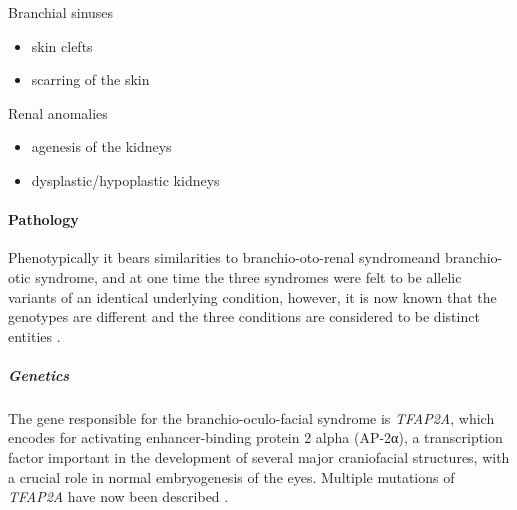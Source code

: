 Branchial sinuses

\begin{itemize}
	\tightlist
	\item
	skin clefts
	\item
	scarring of the skin
\end{itemize}

Renal anomalies

\begin{itemize}
	\tightlist
	\item
	agenesis of the kidneys
	\item
	dysplastic/hypoplastic kidneys
\end{itemize}

\paragraph{Pathology}

Phenotypically it bears similarities to branchio-oto-renal syndromeand branchio-otic syndrome, and at one time the three syndromes were felt to be allelic variants of an identical underlying condition, however, it is now known that the genotypes are different and the three conditions are considered to be distinct entities .

\subparagraph{Genetics}

The gene responsible for the branchio-oculo-facial syndrome is \emph{TFAP2A}, which encodes for activating enhancer-binding protein 2 alpha (AP-2α), a transcription factor important in the development of several major craniofacial structures, with a crucial role in normal embryogenesis of the eyes. Multiple mutations of \emph{TFAP2A} have now been described .